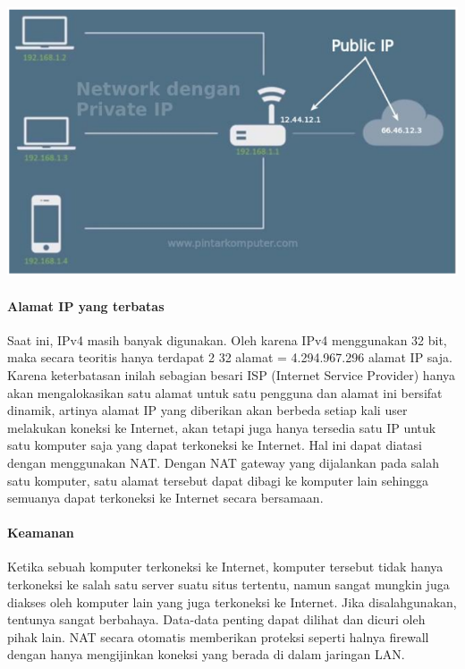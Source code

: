 \documentclass[a4paper,12pt]{article}
\begin{document}
\begin{center}
	\includegraphics[scale=.3]{dasar}
\end{center}

\paragraph{Alamat IP yang terbatas\\}
Saat ini, IPv4 masih banyak digunakan. Oleh karena IPv4 menggunakan 32 bit,
maka secara teoritis hanya terdapat 2 32 alamat = 4.294.967.296 alamat IP saja. Karena
keterbatasan inilah sebagian besari ISP (Internet Service Provider) hanya akan
mengalokasikan satu alamat untuk satu pengguna dan alamat ini bersifat dinamik, artinya
alamat IP yang diberikan akan berbeda setiap kali user melakukan koneksi ke Internet,
akan tetapi juga hanya tersedia satu IP untuk satu komputer saja yang dapat terkoneksi
ke Internet. Hal ini dapat diatasi dengan menggunakan NAT. Dengan NAT gateway yang
dijalankan pada salah satu komputer, satu alamat tersebut dapat dibagi ke komputer lain
sehingga semuanya dapat terkoneksi ke Internet secara bersamaan.

\paragraph{Keamanan\\}
Ketika sebuah komputer terkoneksi ke Internet, komputer tersebut tidak hanya
terkoneksi ke salah satu server suatu situs tertentu, namun sangat mungkin juga diakses
oleh komputer lain yang juga terkoneksi ke Internet. Jika disalahgunakan, tentunya sangat
berbahaya. Data-data penting dapat dilihat dan dicuri oleh pihak lain. NAT secara otomatis
memberikan proteksi seperti halnya firewall dengan hanya mengijinkan koneksi yang
berada di dalam jaringan LAN.
\end{document}
